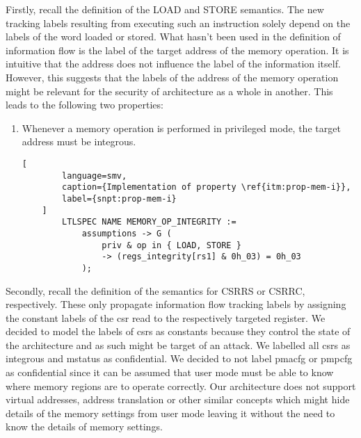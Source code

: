 Firstly, recall the definition of the LOAD and STORE semantics.
The new tracking labels resulting from executing such an instruction solely depend on the labels of the word loaded or stored.
What hasn't been used in the definition of information flow is the label of the target address of the memory operation.
It is intuitive that the address does not influence the label of the information itself.
However, this suggests that the labels of the address of the memory operation might be relevant for the security of architecture as a whole in another.
This leads to the following two properties:
\begin{enumerate}[label=\Roman*.,series=]
    \item \label{itm:prop-mem-i}
    Whenever a memory operation is performed in privileged mode, the target address must be integrous.

    \begin{lstlisting}[
        language=smv,
        caption={Implementation of property \ref{itm:prop-mem-i}},
        label={snpt:prop-mem-i}
    ]
        LTLSPEC NAME MEMORY_OP_INTEGRITY :=
            assumptions -> G (
                priv & op in { LOAD, STORE }
                -> (regs_integrity[rs1] & 0h_03) = 0h_03
            );
    \end{lstlisting}
\end{enumerate}


Secondly, recall the definition of the semantics for CSRRS or CSRRC, respectively.
These only propagate information flow tracking labels by assigning the constant labels of the \gls{csr} read to the respectively targeted register.
We decided to model the labels of \glspl{csr} as constants because they control the state of the architecture and as such might be target of an attack.
We labelled all \glspl{csr} as integrous and \gls{mstatus} as confidential.
We decided to not label \gls{pmacfg} or \gls{pmpcfg} as confidential since it can be assumed that user mode must be able to know where memory regions are to operate correctly.
Our architecture does not support virtual addresses, address translation or other similar concepts which might hide details of the memory settings from user mode leaving it without the need to know the details of memory settings.

